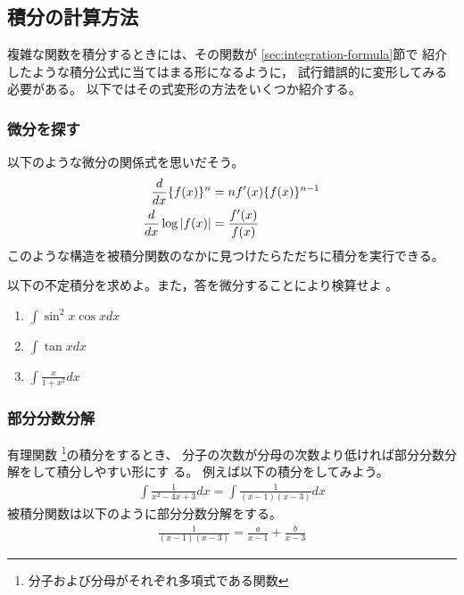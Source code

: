 \documentclass[twocolumn,11pt]{jarticle}
\begin{document}
\subsection{積分の計算方法}

複雑な関数を積分するときには、その関数が
\ref{sec:integration-formula}節で
紹介したような積分公式に当てはまる形になるように，
試行錯誤的に変形してみる必要がある。
以下ではその式変形の方法をいくつか紹介する。

\subsubsection{微分を探す}

以下のような微分の関係式を思いだそう。
\begin{align}
  \frac{d}{dx}\{f(x)\}^n&=nf'(x)\{f(x)\}^{n-1}\notag\\
  \frac{d}{dx}\log |f(x)|&=\frac{f'(x)}{f(x)}\notag
\end{align}
このような構造を被積分関数のなかに見つけたらただちに積分を実行できる。

\exercise
以下の不定積分を求めよ。また，答を微分することにより検算せよ
。
\begin{enumerate}
\item \label{item:sin2xcosx}$\displaystyle\int\sin^2x\cos xdx$
\item \label{item:tanx}$\displaystyle\int \tan x dx$
\item \label{item:x/(1+x2)}$\displaystyle\int \frac{x}{1+x^2}dx$
\end{enumerate}

\subsubsection{部分分数分解}

有理関数
\footnote{分子および分母がそれぞれ多項式である関数}の積分をするとき、
分子の次数が分母の次数より低ければ部分分数分解をして積分しやすい形にす
る。
例えば以下の積分をしてみよう。
\begin{align*}
  \int \frac{1}{x^2-4x+3}dx=\int \frac{1}{(x-1)(x-3)}dx
\end{align*}
被積分関数は以下のように部分分数分解をする。
\begin{align}
  \label{item:1/(x^2-4x+3)}
  \frac{1}{(x-1)(x-3)}=\frac{a}{x-1}+\frac{b}{x-3}
\end{align}
\end{document}
